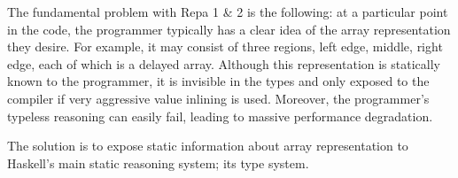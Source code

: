 The fundamental problem with Repa 1 \& 2 is the following: at a particular point in the code, the programmer typically has a clear idea of the array representation they desire. For example, it may consist of three regions, left edge, middle, right edge, each of which is a delayed array. Although this representation is statically known to the programmer, it is invisible in the types and only exposed to the compiler if very aggressive value inlining is used. Moreover, the programmer's typeless reasoning can easily fail, leading to massive performance degradation.

The solution is to expose static information about array representation to Haskell's main static reasoning system; its type system.
